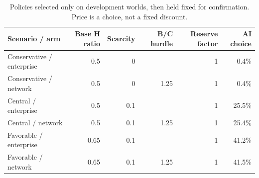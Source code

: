\begin{table}[!htbp]\centering\small
\caption{Policies selected only on development worlds, then held fixed for confirmation. Price is a choice, not a fixed discount.}
\begin{tabularx}{\linewidth}{Yrrrrr}\toprule
Scenario / arm & Base H ratio & Scarcity & B/C hurdle & Reserve factor & AI choice\\\midrule
Conservative / enterprise & 0.5 & 0 & \textemdash{} & 1 & 0.4\%\\
Conservative / network & 0.5 & 0 & 1.25 & 1 & 0.4\%\\
Central / enterprise & 0.5 & 0.1 & \textemdash{} & 1 & 25.5\%\\
Central / network & 0.5 & 0.1 & 1.25 & 1 & 25.4\%\\
Favorable / enterprise & 0.65 & 0.1 & \textemdash{} & 1 & 41.2\%\\
Favorable / network & 0.65 & 0.1 & 1.25 & 1 & 41.5\%\\
\bottomrule
\end{tabularx}
\par{}\par
\end{table}
